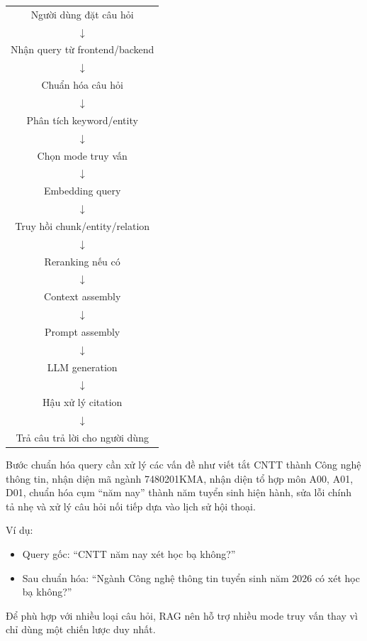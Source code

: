 \documentclass[12pt,a4paper]{report}
\begin{document}
\begin{center}
\begin{tabular}{c}
Người dùng đặt câu hỏi \\
$\downarrow$ \\
Nhận query từ frontend/backend \\
$\downarrow$ \\
Chuẩn hóa câu hỏi \\
$\downarrow$ \\
Phân tích keyword/entity \\
$\downarrow$ \\
Chọn mode truy vấn \\
$\downarrow$ \\
Embedding query \\
$\downarrow$ \\
Truy hồi chunk/entity/relation \\
$\downarrow$ \\
Reranking nếu có \\
$\downarrow$ \\
Context assembly \\
$\downarrow$ \\
Prompt assembly \\
$\downarrow$ \\
LLM generation \\
$\downarrow$ \\
Hậu xử lý citation \\
$\downarrow$ \\
Trả câu trả lời cho người dùng
\end{tabular}
\end{center}

Bước chuẩn hóa query cần xử lý các vấn đề như viết tắt CNTT thành Công nghệ thông tin, nhận diện mã ngành 7480201KMA, nhận diện tổ hợp môn A00, A01, D01, chuẩn hóa cụm ``năm nay'' thành năm tuyển sinh hiện hành, sửa lỗi chính tả nhẹ và xử lý câu hỏi nối tiếp dựa vào lịch sử hội thoại.

Ví dụ:

\begin{itemize}
    \item Query gốc: ``CNTT năm nay xét học bạ không?''
    \item Sau chuẩn hóa: ``Ngành Công nghệ thông tin tuyển sinh năm 2026 có xét học bạ không?''
\end{itemize}

Để phù hợp với nhiều loại câu hỏi, RAG nên hỗ trợ nhiều mode truy vấn thay vì chỉ dùng một chiến lược duy nhất.
\end{document}
